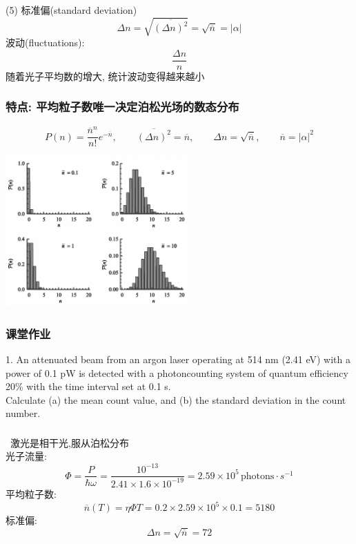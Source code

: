    \begin{frame}
    \frametitle{}
     (5) 标准偏(standard deviation)
     \[ \Delta n = \sqrt{\overline{ (\Delta n)^2 }}  = \sqrt{\overline{n}}  =\left|\alpha\right|  \]
     波动(fluctuations):
     \[ \frac{\Delta n}{n}\]
     随着光子平均数的增大, 统计波动变得越来越小
\end{frame}

\begin{frame}
      \frametitle{特点: 平均粒子数唯一决定泊松光场的数态分布}
      \[P(n) = \frac{\overline{n}^n}{n!} e^{-\overline{n}}, \qquad \overline{ (\Delta n)^2 } = \overline{n}, \qquad  \Delta n = \sqrt{\overline{n}}, \qquad \overline{n}= \left|\alpha\right|^2\]
       \begin{center}
            \includegraphics[width=0.53\textwidth]{figs/2022-05-06-09-01-55.png}
       \end{center}
   \end{frame}

\begin{frame}
    \frametitle{课堂作业}
     \begin{block}{ 1. An attenuated beam from an argon laser operating at
        514 nm (2.41 eV) with a power of 0.1 pW is detected with a photoncounting
        system of quantum efficiency 20\% with the time interval set at
        0.1 s. \\
        {\hspace*{1.5em}} Calculate (a) the mean count value, and (b) the standard deviation
        in the count number.}
     \end{block}
\end{frame}
 
\begin{frame}
 \frametitle{}
      \解~激光是相干光,服从泊松分布\\ 
      光子流量: 
      \[ \varPhi =  \frac{P}{\hbar \omega} = \frac{10^{-13}}{2.41 \times 1.6 \times 10^{-19}} = 2.59 \times 10^{5} \, \text{photons} \cdot s^{-1}  \]
      平均粒子数: 
      \[\overline{n}(T)=\eta \varPhi T= 0.2 \times 2.59 \times 10^{5} \times 0.1 =  5180 \]
      标准偏: 
      \[ \Delta n = \sqrt{\overline{n}} = 72   \]
\end{frame}

